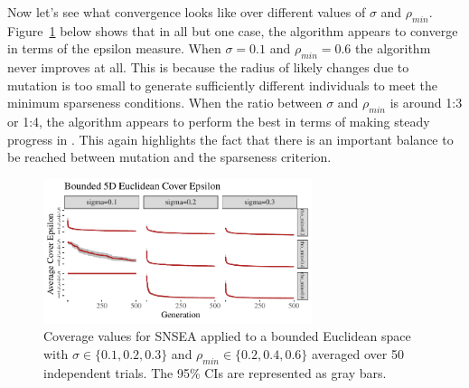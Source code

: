 \documentclass[twoside]{article}
\begin{document}
Now let's see what  convergence looks like over different values of $\sigma$ and $\rho_{min}$.  Figure~\ref{fig:bounded:nopop:sm} below shows that in all but one case, the algorithm appears to converge in terms of the  epsilon measure.  When $\sigma=0.1$ and $\rho_{min} = 0.6$ the algorithm never improves at all.  This is because the radius of likely changes due to mutation is too small to generate sufficiently different individuals to meet the minimum sparseness conditions.  When the ratio between $\sigma$ and $\rho_{min}$ is around 1:3 or 1:4, the algorithm appears to perform the best in terms of making steady progress in .  This again highlights the fact that there is an important balance to be reached between mutation and the sparseness criterion.
%
\begin{figure}[h]
  \center\includegraphics[width=0.7\textwidth]{Figures/bounded-500sm-NOPOP.pdf}
  \caption{\label{fig:bounded:nopop:sm} Coverage values for SNSEA applied to a bounded Euclidean space with $\sigma\in\{0.1,  0.2, 0.3\}$ and $\rho_{min} \in \{0.2, 0.4, 0.6\}$ averaged over 50 independent trials.  The 95\% CIs are represented as gray bars.}
\end{figure}
\end{document}
